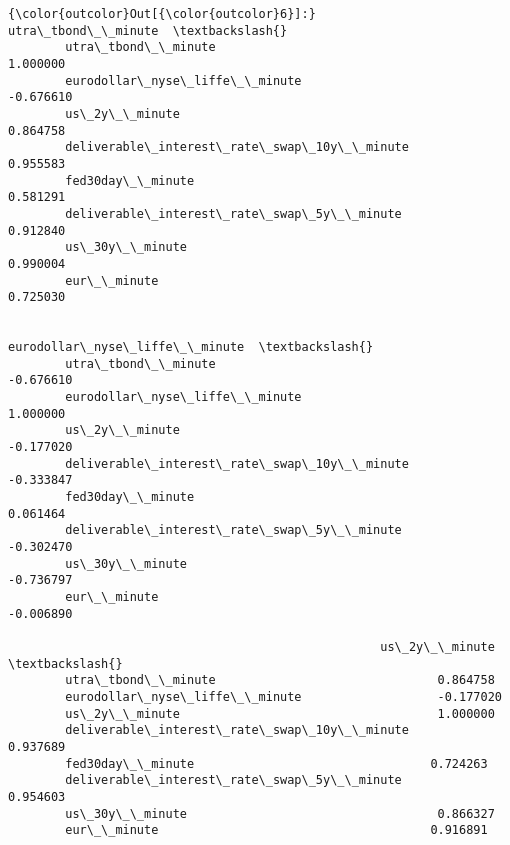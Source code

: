 \documentclass[11pt]{article}
\begin{document}
\begin{Verbatim}[commandchars=\\\{\}]
{\color{outcolor}Out[{\color{outcolor}6}]:}                                             utra\_tbond\_\_minute  \textbackslash{}
        utra\_tbond\_\_minute                                    1.000000   
        eurodollar\_nyse\_liffe\_\_minute                        -0.676610   
        us\_2y\_\_minute                                         0.864758   
        deliverable\_interest\_rate\_swap\_10y\_\_minute            0.955583   
        fed30day\_\_minute                                      0.581291   
        deliverable\_interest\_rate\_swap\_5y\_\_minute             0.912840   
        us\_30y\_\_minute                                        0.990004   
        eur\_\_minute                                           0.725030   
        
                                                    eurodollar\_nyse\_liffe\_\_minute  \textbackslash{}
        utra\_tbond\_\_minute                                              -0.676610   
        eurodollar\_nyse\_liffe\_\_minute                                    1.000000   
        us\_2y\_\_minute                                                   -0.177020   
        deliverable\_interest\_rate\_swap\_10y\_\_minute                      -0.333847   
        fed30day\_\_minute                                                 0.061464   
        deliverable\_interest\_rate\_swap\_5y\_\_minute                       -0.302470   
        us\_30y\_\_minute                                                  -0.736797   
        eur\_\_minute                                                     -0.006890   
        
                                                    us\_2y\_\_minute  \textbackslash{}
        utra\_tbond\_\_minute                               0.864758   
        eurodollar\_nyse\_liffe\_\_minute                   -0.177020   
        us\_2y\_\_minute                                    1.000000   
        deliverable\_interest\_rate\_swap\_10y\_\_minute       0.937689   
        fed30day\_\_minute                                 0.724263   
        deliverable\_interest\_rate\_swap\_5y\_\_minute        0.954603   
        us\_30y\_\_minute                                   0.866327   
        eur\_\_minute                                      0.916891   
        

\end{Verbatim}
\end{document}
